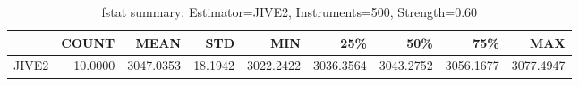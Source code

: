\begin{table}[ht]
\centering
\caption{fstat summary: Estimator=JIVE2, Instruments=500, Strength=0.60}
\begin{tabular}{lrrrrrrrr}
\toprule
 & COUNT & MEAN & STD & MIN & 25\% & 50\% & 75\% & MAX \\
\midrule
JIVE2 & 10.0000 & 3047.0353 & 18.1942 & 3022.2422 & 3036.3564 & 3043.2752 & 3056.1677 & 3077.4947 \\
\bottomrule
\end{tabular}
\end{table}
